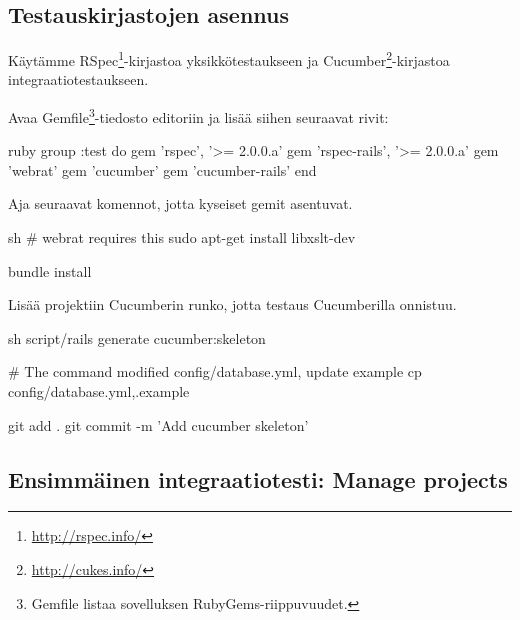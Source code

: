 \documentclass{article}
\newcommand{\en}[1]{\foreignlanguage{english}{#1}}
\begin{document}
\subsection{Testauskirjastojen asennus}

Käytämme RSpec\footnote{\url{http://rspec.info/}}-kirjastoa yksikkötestaukseen
ja Cucumber\footnote{\url{http://cukes.info/}}-kirjastoa
integraatiotestaukseen.

\begin{samepage}
Avaa Gemfile\footnote{Gemfile listaa sovelluksen
RubyGems-riippuvuudet.}-tiedosto editoriin ja lisää siihen seuraavat rivit:

\begin{pygmented}{ruby}
group :test do
  gem 'rspec', '>= 2.0.0.a'
  gem 'rspec-rails', '>= 2.0.0.a'
  gem 'webrat'
  gem 'cucumber'
  gem 'cucumber-rails'
end
\end{pygmented}
\end{samepage}

\begin{samepage}
Aja seuraavat komennot, jotta kyseiset gemit asentuvat.

\begin{pygmented}{sh}
# webrat requires this
sudo apt-get install libxslt-dev

bundle install
\end{pygmented}
\end{samepage}

\begin{samepage}
Lisää projektiin Cucumberin runko, jotta testaus Cucumberilla onnistuu.

\begin{pygmented}{sh}
script/rails generate cucumber:skeleton

# The command modified config/database.yml, update example
cp config/database.yml{,.example}

git add .
git commit -m 'Add cucumber skeleton'
\end{pygmented}
\end{samepage}

\subsection{Ensimmäinen integraatiotesti: Manage projects}
\end{document}
